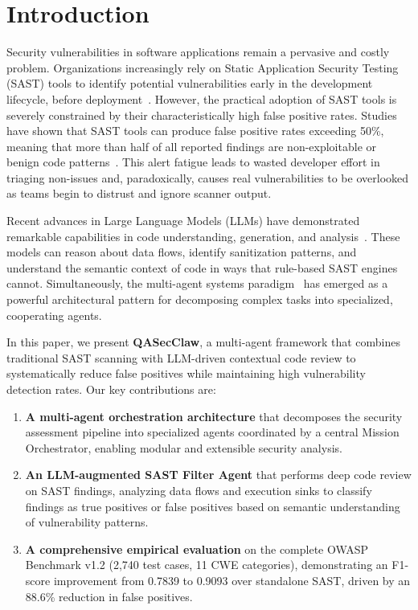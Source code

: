 \documentclass[conference]{IEEEtran}
\begin{document}
\section{Introduction}
\label{sec:introduction}

Security vulnerabilities in software applications remain a pervasive and costly problem. Organizations increasingly rely on Static Application Security Testing (SAST) tools to identify potential vulnerabilities early in the development lifecycle, before deployment~\cite{chess2004static}. However, the practical adoption of SAST tools is severely constrained by their characteristically high false positive rates. Studies have shown that SAST tools can produce false positive rates exceeding 50\%, meaning that more than half of all reported findings are non-exploitable or benign code patterns~\cite{johnson2013don, sadowski2015tricorder}. This alert fatigue leads to wasted developer effort in triaging non-issues and, paradoxically, causes real vulnerabilities to be overlooked as teams begin to distrust and ignore scanner output.

Recent advances in Large Language Models (LLMs) have demonstrated remarkable capabilities in code understanding, generation, and analysis~\cite{chen2021evaluating, feng2020codebert}. These models can reason about data flows, identify sanitization patterns, and understand the semantic context of code in ways that rule-based SAST engines cannot. Simultaneously, the multi-agent systems paradigm~\cite{wooldridge2009introduction} has emerged as a powerful architectural pattern for decomposing complex tasks into specialized, cooperating agents.

In this paper, we present \textbf{QASecClaw}, a multi-agent framework that combines traditional SAST scanning with LLM-driven contextual code review to systematically reduce false positives while maintaining high vulnerability detection rates. Our key contributions are:

\begin{enumerate}
    \item \textbf{A multi-agent orchestration architecture} that decomposes the security assessment pipeline into specialized agents coordinated by a central Mission Orchestrator, enabling modular and extensible security analysis.
    \item \textbf{An LLM-augmented SAST Filter Agent} that performs deep code review on SAST findings, analyzing data flows and execution sinks to classify findings as true positives or false positives based on semantic understanding of vulnerability patterns.
    \item \textbf{A comprehensive empirical evaluation} on the complete OWASP Benchmark v1.2 (2,740 test cases, 11 CWE categories), demonstrating an F1-score improvement from 0.7839 to 0.9093 over standalone SAST, driven by an 88.6\% reduction in false positives.
\end{enumerate}
\end{document}
